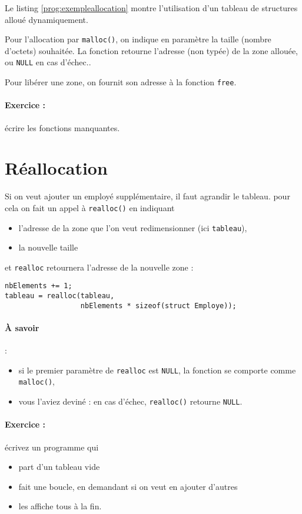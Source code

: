 Le listing \ref{prog:exempleallocation} montre l'utilisation d'un tableau
de structures alloué dynamiquement.




Pour l'allocation par \texttt{malloc()}, on indique en paramètre la
taille (nombre d'octets) souhaitée. La fonction retourne l'adresse
(non typée) de la zone allouée, ou \texttt{NULL} en cas d'échec..

Pour libérer une zone, on fournit son adresse à la fonction \texttt{free}.

\paragraph{Exercice :} écrire les fonctions manquantes.


\section{Réallocation}

Si on veut ajouter un employé supplémentaire, il faut agrandir le tableau. pour cela on fait un appel à \texttt{realloc()} en indiquant

\begin{itemize}
\item l'adresse de la zone que l'on veut redimensionner (ici \texttt{tableau}),
\item la nouvelle taille
\end{itemize}
et \texttt{realloc} retournera l'adresse de la nouvelle zone :

\begin{lstlisting}[style=cextract]
nbElements += 1;
tableau = realloc(tableau,
                  nbElements * sizeof(struct Employe));
\end{lstlisting}

\paragraph{À savoir} : \begin{itemize}
  \item si le premier paramètre de \texttt{realloc} est \texttt{NULL},
    la fonction se comporte comme \texttt{malloc()},
  \item vous l'aviez deviné : en cas d'échec, \texttt{realloc()} retourne \texttt{NULL}.
\end{itemize}

\paragraph{Exercice :} écrivez un programme qui \begin{itemize}
\item part d'un tableau vide
\item fait une boucle, en demandant si on veut en ajouter d'autres
  \item les affiche tous à la fin.
\end{itemize}

